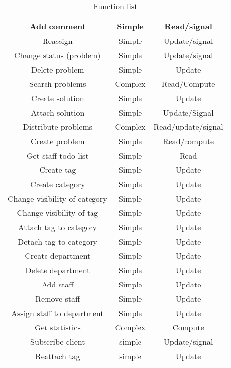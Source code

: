 \begin{table}[h]
\begin{center}
\begin{tabular}{|c|c|c|}
\hline
Add comment &   Simple & Read/signal   \\ \hline%
Reassign & Simple   & Update/signal \\ \hline%
Change status (problem) &   Simple & Update/signal \\ \hline%
Delete problem & Simple &   Update \\   \hline%
Search problems & Complex &   Read/Compute \\ \hline%
Create solution & Simple &   Update \\   \hline%
Attach solution & Simple &   Update/Signal \\   \hline%
Distribute problems &   Complex & Read/update/signal \\   \hline%
Create problem &   Simple & Read/compute \\   \hline%
Get staff todo list & Simple & Read \\   \hline%
Create tag & Simple &   Update \\ \hline%
Create category & Simple & Update \\ \hline%
Change visibility of category &   Simple &   Update \\   \hline%
Change visibility of tag &   Simple &  Update \\ \hline%
Attach tag to category & Simple & Update \\ \hline%
Detach tag to category & Simple & Update \\ \hline%
Create department & Simple & Update \\ \hline%
Delete department & Simple & Update \\ \hline%
Add staff & Simple & Update \\ \hline%
Remove staff & Simple & Update \\ \hline%
Assign staff to department & Simple & Update \\ \hline%
Get statistics & Complex & Compute \\ \hline%
Subscribe client & simple & Update/signal \\ \hline%
Reattach tag & simple & Update \\ \hline%



\end{tabular}
\end{center}
\caption{Function list}
\label{tab:functionlist}
\end{table}

